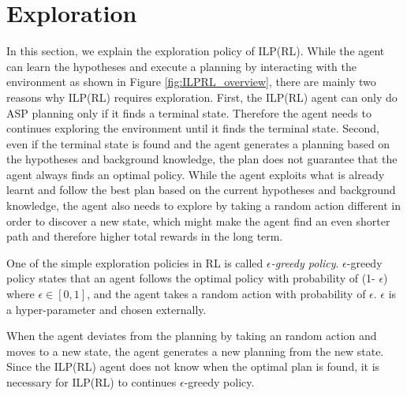 \section{Exploration}
\label{exploration}
In this section, we explain the exploration policy of ILP(RL). While the agent can learn the hypotheses and execute a planning by interacting with the environment as shown in Figure \ref{fig:ILPRL_overview},
there are mainly two reasons why ILP(RL) requires exploration. 
First, the ILP(RL) agent can only do ASP planning only if it finds a terminal state. 
Therefore the agent needs to continues exploring the environment until it finds the terminal state. 
Second, even if the terminal state is found and the agent generates a planning based on the hypotheses and background knowledge, 
the plan does not guarantee that the agent always finds an optimal policy.
While the agent exploits what is already learnt and follow the best plan based on the current hypotheses and background knowledge,
the agent also needs to explore by taking a random action different in order to discover a new state, which might make the agent find an even shorter path and therefore higher total rewards in the long term.

One of the simple exploration policies in RL is called \textit{$\epsilon$-greedy policy}.
$\epsilon$-greedy policy states that an agent follows the optimal policy with probability of (1- $\epsilon$) where $\epsilon \in [0,1]$, 
and the agent takes a random action with probability of $\epsilon$. $\epsilon$ is a hyper-parameter and chosen externally.

When the agent deviates from the planning by taking an random action and moves to a new state, the agent generates a new planning from the new state. 
Since the ILP(RL) agent does not know when the optimal plan is found, it is necessary for ILP(RL) to continues $\epsilon$-greedy policy.

